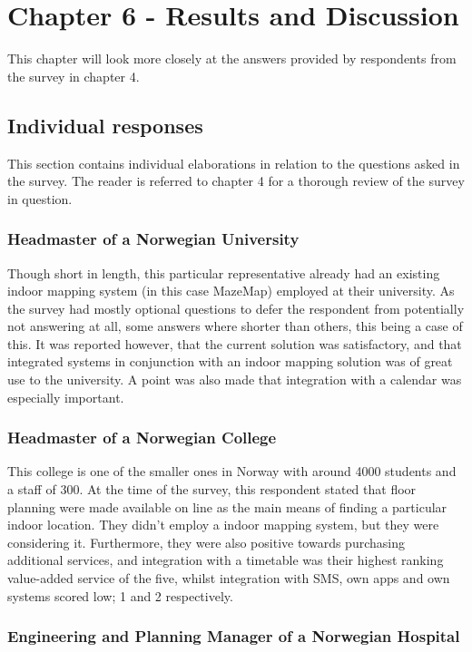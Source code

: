\chapter{Chapter 6 - Results and Discussion}
This chapter will look more closely at the answers provided by respondents from the survey in chapter 4. 
\section{Individual responses}
This section contains individual elaborations in relation to the questions asked in the survey. The reader is referred to chapter 4 for a thorough review of the survey in question.
\subsection{Headmaster of a Norwegian University}
Though short in length, this particular representative already had an existing indoor mapping system (in this case MazeMap) employed at their university. As the survey had mostly optional questions to defer the respondent from potentially not answering at all, some answers where shorter than others, this being a case of this. It was reported however, that the current solution was satisfactory, and that integrated systems in conjunction with an indoor mapping solution was of great use to the university. A point was also made that integration with a calendar was especially important.
\subsection{Headmaster of a Norwegian College}
This college is one of the smaller ones in Norway with around 4000 students and a staff of 300. At the time of the survey, this respondent stated that floor planning were made available on line as the main means of finding a particular indoor location. They didn't employ a indoor mapping system, but they were considering it. Furthermore, they were also positive towards purchasing additional services, and integration with a timetable was their highest ranking value-added service of the five, whilst integration with SMS, own apps and own systems scored low; 1 and 2 respectively.
\subsection{Engineering and Planning Manager of a Norwegian Hospital}